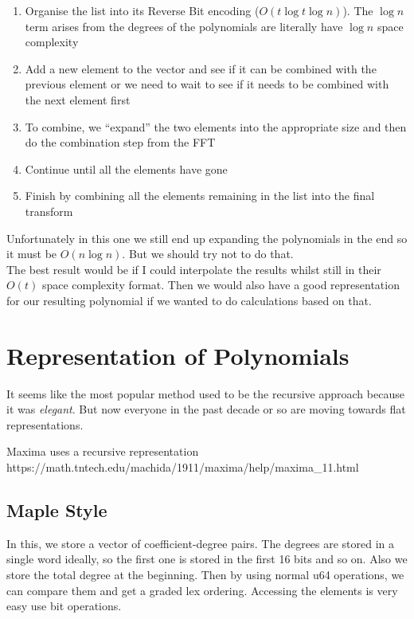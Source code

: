 \begin{enumerate}[1.]
  \item Organise the list into its Reverse Bit encoding ($O(t \log t \log n)$). The $\log n$ term arises from the degrees of the polynomials are literally have $\log n$ space complexity
  \item Add a new element to the vector and see if it can be combined with the previous element or we need to wait to see if it needs to be combined with the next element first
  \item To combine, we ``expand'' the two elements into the appropriate size and then do the combination step from the FFT
  \item Continue until all the elements have gone
  \item Finish by combining all the elements remaining in the list into the final transform
\end{enumerate}

Unfortunately in this one we still end up expanding the polynomials in the end so it must be $O(n\log n)$. But we should try not to do that.\\
The best result would be if I could interpolate the results whilst still in their $O(t)$ space complexity format. Then we would also have a good representation for our resulting polynomial if we wanted to do calculations based on that.

\section{Representation of Polynomials}

It seems like the most popular method used to be the recursive approach because it was \emph{elegant}. But now everyone in the past decade or so are moving towards flat representations.

Maxima uses a recursive representation https://math.tntech.edu/machida/1911/maxima/help/maxima\_11.html

\subsection{Maple Style}%
\label{sub:Maple Style}

In this, we store a vector of coefficient-degree pairs. The degrees are stored in a single word ideally, so the first one is stored in the first 16 bits and so on. Also we store the total degree at the beginning. Then by using normal u64 operations, we can compare them and get a graded lex ordering. Accessing the elements is very easy use bit operations.

